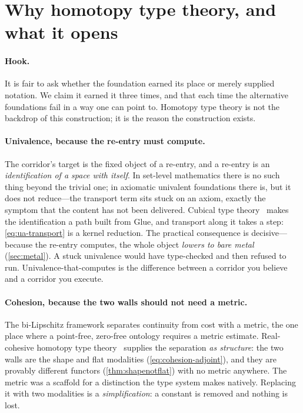 \documentclass[11pt,letterpaper]{article}
\theoremstyle{plain}
\theoremstyle{definition}
\theoremstyle{remark}
\begin{document}
\section{Why homotopy type theory, and what it opens}\label{sec:hott}

\paragraph{Hook.}
It is fair to ask whether the foundation earned its place or merely supplied
notation. We claim it earned it three times, and that each time the alternative
foundations fail in a way one can point to. Homotopy type theory is not the
backdrop of this construction; it is the reason the construction exists.

\paragraph{Univalence, because the re-entry must compute.}
The corridor's target is the fixed object of a re-entry, and a re-entry is an
\emph{identification of a space with itself}. In set-level mathematics there is no
such thing beyond the trivial one; in axiomatic univalent foundations there is,
but it does not reduce---the transport term sits stuck on an axiom, exactly the
symptom that the content has not been delivered. Cubical type
theory~\citep{cohen2018cubical} makes the identification a path built from Glue,
and transport along it takes a step: \cref{eq:ua-transport} is a kernel reduction.
The practical consequence is decisive---because the re-entry computes, the whole
object \emph{lowers to bare metal} (\cref{sec:metal}). A stuck univalence would
have type-checked and then refused to run. Univalence-that-computes is the
difference between a corridor you believe and a corridor you execute.

\paragraph{Cohesion, because the two walls should not need a metric.}
The bi-Lipschitz framework separates continuity from cost with a metric, the one
place where a point-free, zero-free ontology requires a metric estimate.
Real-cohesive homotopy type
theory~\citep{shulman2018brouwer} supplies the separation \emph{as structure}: the
two walls are the shape and flat modalities (\cref{eq:cohesion-adjoint}), and they
are provably different functors (\cref{thm:shapenotflat}) with no metric anywhere.
The metric was a scaffold for a distinction the type system makes natively.
Replacing it with two modalities is a
\emph{simplification}: a constant is removed and nothing is lost.
\end{document}
